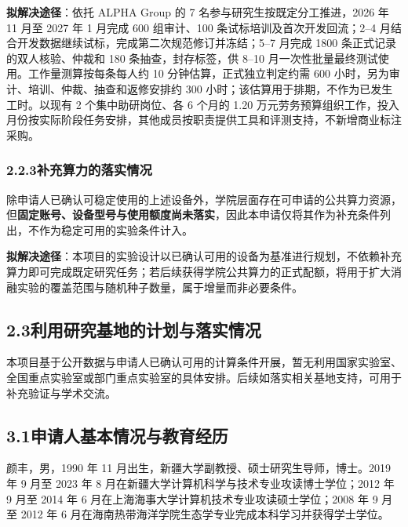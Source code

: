\textbf{拟解决途径}：依托 ALPHA Group 的 7 名参与研究生按既定分工推进，2026 年 11 月至 2027 年 1 月完成 600 组审计、100 条试标培训及首次开发回流；2--4 月结合开发数据继续试标，完成第二次规范修订并冻结；5--7 月完成 1800 条正式记录的双人核验、仲裁和 180 条抽查，封存标签，供 8--10 月一次性批量最终测试使用。工作量测算按每条每人约 10 分钟估算，正式独立判定约需 600 小时，另为审计、培训、仲裁、抽查和返修安排约 300 小时；该估算用于排期，不作为已发生工时。以现有 2 个集中助研岗位、各 6 个月的 1.20 万元劳务预算组织工作，投入月份按实际阶段任务安排，其他成员按职责提供工具和评测支持，不新增商业标注采购。

\subsubsection*{2.2.3\quad 补充算力的落实情况}

除申请人已确认可稳定使用的上述设备外，学院层面存在可申请的公共算力资源，但\textbf{固定账号、设备型号与使用额度尚未落实}，因此本申请仅将其作为补充条件列出，不作为稳定可用的实验条件计入。

\textbf{拟解决途径}：本项目的实验设计以已确认可用的设备为基准进行规划，不依赖补充算力即可完成既定研究任务；若后续获得学院公共算力的正式配额，将用于扩大消融实验的覆盖范围与随机种子数量，属于增量而非必要条件。

\subsection*{2.3\quad 利用研究基地的计划与落实情况}

本项目基于公开数据与申请人已确认可用的计算条件开展，暂无利用国家实验室、全国重点实验室或部门重点实验室的具体安排。后续如落实相关基地支持，可用于补充验证与学术交流。



\subsection*{3.1\quad 申请人基本情况与教育经历}

颜丰，男，1990 年 11 月出生，新疆大学副教授、硕士研究生导师，博士。2019 年 9 月至 2023 年 8 月在新疆大学计算机科学与技术专业攻读博士学位；2012 年 9 月至 2014 年 6 月在上海海事大学计算机技术专业攻读硕士学位；2008 年 9 月至 2012 年 6 月在海南热带海洋学院生态学专业完成本科学习并获得学士学位。

